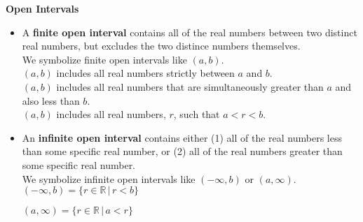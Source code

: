 \documentclass{ximera}
\begin{document}
\begin{definition}  \textbf{\textcolor{green!50!black}{Open Intervals}} 



\begin{itemize}
\item A \textbf{finite open interval} contains all of the real numbers between two distinct real numbers, but excludes the two distince numbers themselves.\\

We symbolize finite open intervals like $(a, b)$. \\

$(a,b)$ includes all real numbers strictly between $a$ and $b$. \\ 
$(a,b)$ includes all real numbers that are simultaneously greater than $a$ and also less than $b$.  \\
$(a,b)$ includes all real numbers, $r$, such that $a < r < b$.



\item An \textbf{infinite open interval} contains either (1) all of the real numbers less than some specific real number, or (2) all of the real numbers greater than some specific real number. \\

We symbolize infinite open intervals like $(-\infty, b)$ or $(a, \infty)$. \\

$(-\infty, b) = \{ r \in \mathbb{R} \, | \,  r < b     \}$

$(a, \infty) = \{ r \in \mathbb{R} \, | \,  a < r     \}$

\end{itemize}

\end{definition}
\end{document}
